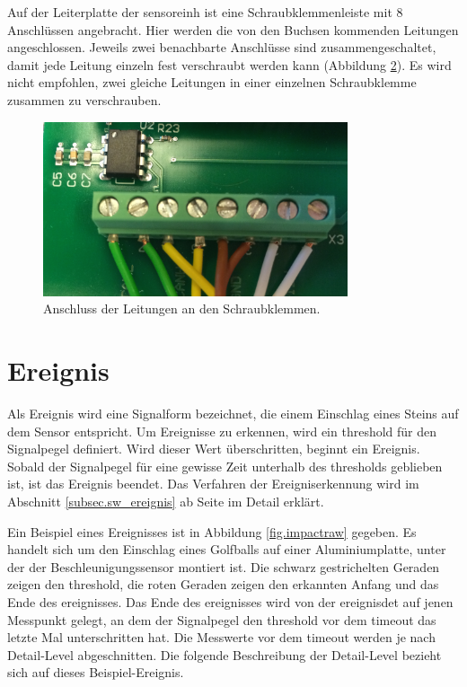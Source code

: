 \begin{figure}
\begin{minipage}{0.5\textwidth}
	\label{fig.polstecker}
\end{minipage}
\end{figure}

Auf der Leiterplatte der \gls{sensoreinh} ist eine Schraubklemmenleiste mit 8 Anschlüssen angebracht. Hier werden die von den Buchsen kommenden Leitungen angeschlossen. Jeweils zwei benachbarte Anschlüsse sind zusammengeschaltet, damit jede Leitung einzeln fest verschraubt werden kann (Abbildung \ref{fig.kabel}). Es wird nicht empfohlen, zwei gleiche Leitungen in einer einzelnen Schraubklemme zusammen zu verschrauben.

\begin{figure}
	\centering
		\includegraphics[width=0.8\textwidth]{images/AnschlussKabel.png}
	\caption{Anschluss der Leitungen an den Schraubklemmen.}
	\label{fig.kabel}
\end{figure}









\section{Ereignis}\label{sec.manualimpact}
Als Ereignis wird eine Signalform bezeichnet, die einem Einschlag eines Steins auf dem Sensor entspricht. Um Ereignisse zu erkennen, wird ein \gls{threshold} für den Signalpegel definiert. Wird dieser Wert überschritten, beginnt ein Ereignis. Sobald der Signalpegel für eine gewisse Zeit unterhalb des \gls{threshold}s geblieben ist, ist das Ereignis beendet. Das Verfahren der Ereigniserkennung wird im Abschnitt \ref{subsec.sw_ereignis} ab Seite \pageref{subsec.sw_ereignis} im Detail erklärt.

Ein Beispiel eines Ereignisses ist in Abbildung \ref{fig.impactraw} gegeben. Es handelt sich um den Einschlag eines Golfballs auf einer Aluminiumplatte, unter der der Beschleunigungssensor montiert ist. Die schwarz gestrichelten Geraden zeigen den \gls{threshold}, die roten Geraden zeigen den erkannten Anfang und das Ende des \gls{ereignis}ses. Das Ende des \gls{ereignis}ses wird von der \gls{ereignisdet} auf jenen Messpunkt gelegt, an dem der Signalpegel den \gls{threshold} vor dem \gls{timeout} das letzte Mal unterschritten hat. Die Messwerte vor dem \gls{timeout} werden je nach Detail-Level abgeschnitten. Die folgende Beschreibung der Detail-Level bezieht sich auf dieses Beispiel-Ereignis.

